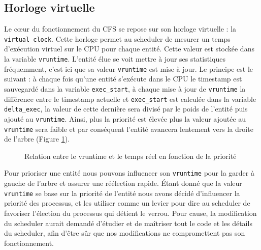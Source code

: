 \subsection{Horloge virtuelle}
Le cœur du fonctionnement du CFS se repose sur son horloge virtuelle : la
\verb|virtual clock|. Cette horloge permet au scheduler de mesurer un temps
d'exécution virtuel sur le CPU pour chaque entité. Cette valeur est stockée dans
la variable \verb|vruntime|. L'entité élue se voit mettre à jour ses statistiques
fréquemment, c'est ici que sa valeur \verb|vruntime| est mise à jour. Le
principe est le suivant : à chaque fois qu'une entité s'exécute dans le CPU le
timestamp est sauvegardé dans la variable \verb|exec_start|, à chaque mise à
jour de \verb|vruntime| la différence entre le timestamp actuelle et
\verb|exec_start| est calculée dans la variable \verb|delta_exec|, la valeur de
cette dernière sera divisé par le poids de l'entité puis ajouté au
\verb|vruntime|. Ainsi, plus la priorité est élevée plus la valeur ajoutée au
\verb|vruntime| sera faible et par conséquent l'entité avancera lentement vers
la droite de l'arbre (Figure \ref{fig:sched}).
\begin{figure}[h!]
	\centering
	\caption{Relation entre le vruntime et le temps réel en fonction de la priorité}
	\label{fig:sched}
\end{figure}


Pour prioriser une entité nous pouvons influencer son 
\verb|vruntime| pour la garder à gauche de l'arbre et assurer une réélection 
rapide. Étant donné que la valeur \verb|vruntime| se base sur la priorité de 
l'entité nous avons décidé d'influencer la priorité des processus, et 
les utiliser comme un levier pour dire au scheduler de favoriser l'élection 
du processus qui détient le verrou. Pour cause, la modification du scheduler aurait
demandé d'étudier et de maîtriser tout le code et les détails du scheduler, afin
d'être sûr que nos modifications ne compromettent pas son fonctionnement.